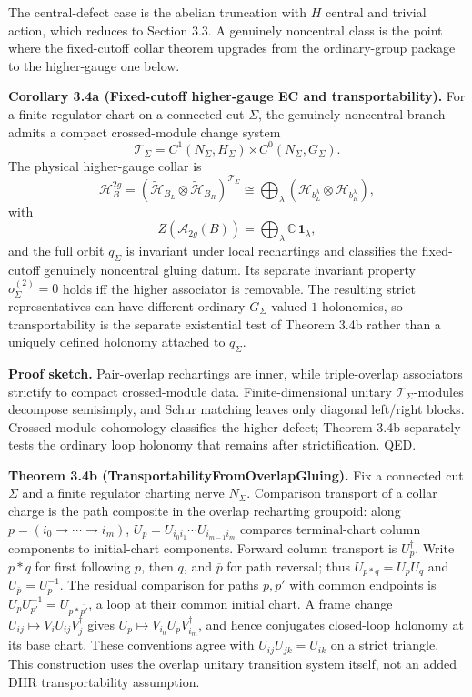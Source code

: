 The central-defect case is the abelian truncation with \(H\) central and trivial action, which reduces to Section 3.3. A genuinely noncentral class is the point where the fixed-cutoff collar theorem upgrades from the ordinary-group package to the higher-gauge one below.

\textbf{Corollary 3.4a (Fixed-cutoff higher-gauge EC and transportability).} For a finite regulator chart on a connected cut \(\Sigma\), the genuinely noncentral branch admits a compact crossed-module change system
\[
\mathcal T_\Sigma
=
C^1(N_\Sigma,H_\Sigma)\rtimes C^0(N_\Sigma,G_\Sigma).
\]
The physical higher-gauge collar is
\[
\mathcal H_B^{2g}
=
(\widetilde{\mathcal H}_{B_L}\otimes \widetilde{\mathcal H}_{B_R})^{\mathcal T_\Sigma}
\cong
\bigoplus_\lambda
(\mathcal H_{b_L^\lambda}\otimes \mathcal H_{b_R^\lambda}),
\]
with
\[
Z(\mathcal A_{2g}(B))
=
\bigoplus_\lambda \mathbb C\,\mathbf 1_\lambda,
\]
and the full orbit \(q_\Sigma\) is invariant under local rechartings and classifies the fixed-cutoff
genuinely noncentral gluing datum. Its separate invariant property \(o^{(2)}_\Sigma=0\) holds iff
the higher associator is removable. The resulting strict representatives can have different
ordinary \(G_\Sigma\)-valued \(1\)-holonomies, so transportability is the separate existential test
of Theorem 3.4b rather than a uniquely defined holonomy attached to \(q_\Sigma\).

\textbf{Proof sketch.} Pair-overlap rechartings are inner, while triple-overlap associators strictify to compact crossed-module data. Finite-dimensional unitary \(\mathcal T_\Sigma\)-modules decompose semisimply, and Schur matching leaves only diagonal left/right blocks. Crossed-module cohomology classifies the higher defect; Theorem 3.4b separately tests the ordinary loop holonomy that remains after strictification. QED.

\textbf{Theorem 3.4b (TransportabilityFromOverlapGluing).} Fix a connected cut
\(\Sigma\) and a finite regulator charting nerve \(N_\Sigma\). Comparison
transport of a collar charge is the path composite in the overlap recharting
groupoid: along \(p=(i_0\to\cdots\to i_m)\),
\(U_p=U_{i_0i_1}\cdots U_{i_{m-1}i_m}\) compares terminal-chart column
components to initial-chart components. Forward column transport is
\(U_p^\dagger\). Write \(p\ast q\) for first following \(p\), then \(q\),
and \(\overline p\) for path reversal; thus
\(U_{p\ast q}=U_pU_q\) and \(U_{\overline p}=U_p^{-1}\).
The residual comparison for paths \(p,p'\) with common endpoints is
\(U_pU_{p'}^{-1}=U_{p\ast\overline{p'}}\), a loop at their common initial
chart. A frame change \(U_{ij}\mapsto V_iU_{ij}V_j^\dagger\) gives
\(U_p\mapsto V_{i_0}U_pV_{i_m}^\dagger\), and hence conjugates closed-loop
holonomy at its base chart. These conventions agree with
\(U_{ij}U_{jk}=U_{ik}\) on a strict triangle. This construction uses the
overlap unitary transition system itself, not an added DHR transportability
assumption.

